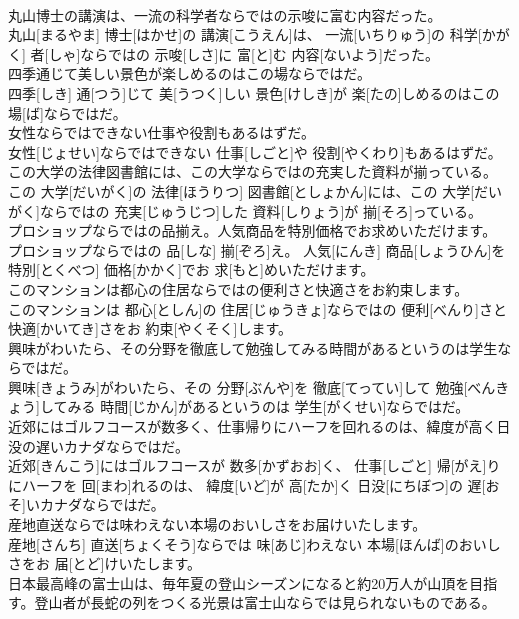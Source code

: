 \documentclass[8pt]{extreport}
\begin{document}
\begin{CJK}{UTF8}{min}
\\	丸山博士の講演は、一流の科学者ならではの示唆に富む内容だった。	
\\	丸山[まるやま] 博士[はかせ]の 講演[こうえん]は、 一流[いちりゅう]の 科学[かがく] 者[しゃ]ならではの 示唆[しさ]に 富[と]む 内容[ないよう]だった。
\\	四季通じて美しい景色が楽しめるのはこの場ならではだ。	
\\	四季[しき] 通[つう]じて 美[うつく]しい 景色[けしき]が 楽[たの]しめるのはこの 場[ば]ならではだ。
\\	女性ならではできない仕事や役割もあるはずだ。	
\\	女性[じょせい]ならではできない 仕事[しごと]や 役割[やくわり]もあるはずだ。
\\	この大学の法律図書館には、この大学ならではの充実した資料が揃っている。	
\\	この 大学[だいがく]の 法律[ほうりつ] 図書館[としょかん]には、この 大学[だいがく]ならではの 充実[じゅうじつ]した 資料[しりょう]が 揃[そろ]っている。
\\	プロショップならではの品揃え。人気商品を特別価格でお求めいただけます。	
\\	プロショップならではの 品[しな] 揃[ぞろ]え。 人気[にんき] 商品[しょうひん]を 特別[とくべつ] 価格[かかく]でお 求[もと]めいただけます。
\\	このマンションは都心の住居ならではの便利さと快適さをお約束します。	
\\	このマンションは 都心[としん]の 住居[じゅうきょ]ならではの 便利[べんり]さと 快適[かいてき]さをお 約束[やくそく]します。
\\	興味がわいたら、その分野を徹底して勉強してみる時間があるというのは学生ならではだ。	
\\	興味[きょうみ]がわいたら、その 分野[ぶんや]を 徹底[てってい]して 勉強[べんきょう]してみる 時間[じかん]があるというのは 学生[がくせい]ならではだ。
\\	近郊にはゴルフコースが数多く、仕事帰りにハーフを回れるのは、緯度が高く日没の遅いカナダならではだ。	
\\	近郊[きんこう]にはゴルフコースが 数多[かずおお]く、 仕事[しごと] 帰[がえ]りにハーフを 回[まわ]れるのは、 緯度[いど]が 高[たか]く 日没[にちぼつ]の 遅[おそ]いカナダならではだ。
\\	産地直送ならでは味わえない本場のおいしさをお届けいたします。	
\\	産地[さんち] 直送[ちょくそう]ならでは 味[あじ]わえない 本場[ほんば]のおいしさをお 届[とど]けいたします。
\\	日本最高峰の富士山は、毎年夏の登山シーズンになると約20万人が山頂を目指す。登山者が長蛇の列をつくる光景は富士山ならでは見られないものである。	

\end{CJK}
\end{document}
